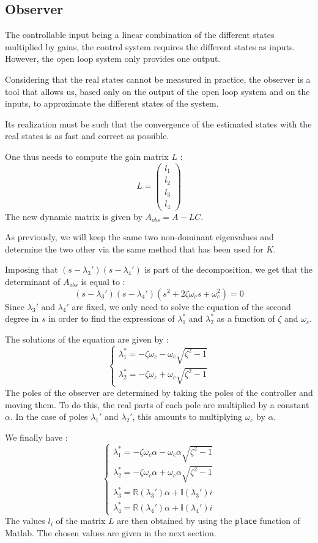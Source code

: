 \subsection{Observer}
The controllable input being a linear combination of the different states multiplied by gains, the control system requires the different states as inputs. However, the open loop system only provides one output.\par
Considering that the real states cannot be measured in practice, the observer is a tool that allows us, based only on the output of the open loop system and on the inputs, to approximate the different states of the system.\par
Its realization must be such that the convergence of the estimated states with the real states is as fast and correct as possible.\par
One thus needs to compute the gain matrix $L$ :
$$
L = \begin{pmatrix}
    l_1\\
    l_2\\
    l_3\\
    l_4
\end{pmatrix}
$$
The new dynamic matrix is given by $A_{obs} = A - LC$.\par
As previously, we will keep the same two non-dominant eigenvalues and determine the two other via the same method that has been used for $K$.\par
Imposing that $(s - \lambda_3')(s - \lambda_4')$ is part of the decomposition, we get that the determinant of $A_{obs}$ is equal to :
$$
(s - \lambda_3')(s - \lambda_4')(s^2 + 2 \zeta\omega_c s + \omega_c^2) = 0
$$
Since $\lambda_3'$ and $\lambda_4'$ are fixed, we only need to solve the equation of the second degree in $s$ in order to find the expressions of $\lambda_1^*$ and $\lambda_2^*$ as a function of $\zeta$ and $\omega_c$.\par
The solutions of the equation are given by :
$$
\begin{cases}
    \lambda_1^* = -\zeta\omega_c - \omega_c\sqrt{\zeta^2 - 1}\\
    \lambda_2^* = -\zeta\omega_c + \omega_c\sqrt{\zeta^2 - 1}
\end{cases}
$$
The poles of the observer are determined by taking the poles of the controller and moving them. To do this, the real parts of each pole are multiplied by a constant $\alpha$. In the case of poles $\lambda_1'$ and $\lambda_2'$, this amounts to multiplying $\omega_c$ by $\alpha$.\par
We finally have :
$$
\begin{cases}
    \lambda_1^* = -\zeta\omega_c\alpha - \omega_c\alpha\sqrt{\zeta^2 - 1}\\
    \lambda_2^* = -\zeta\omega_c\alpha + \omega_c\alpha\sqrt{\zeta^2 - 1}\\
    \lambda_3^* = \mathbb{R}(\lambda_3')\alpha + \mathbb{I}(\lambda_3')i\\
    \lambda_4^* = \mathbb{R}(\lambda_4')\alpha + \mathbb{I}(\lambda_4')i
\end{cases}
$$
The values $l_i$ of the matrix $L$ are then obtained by using the \texttt{place} function of Matlab. The chosen values are given in the next section.

